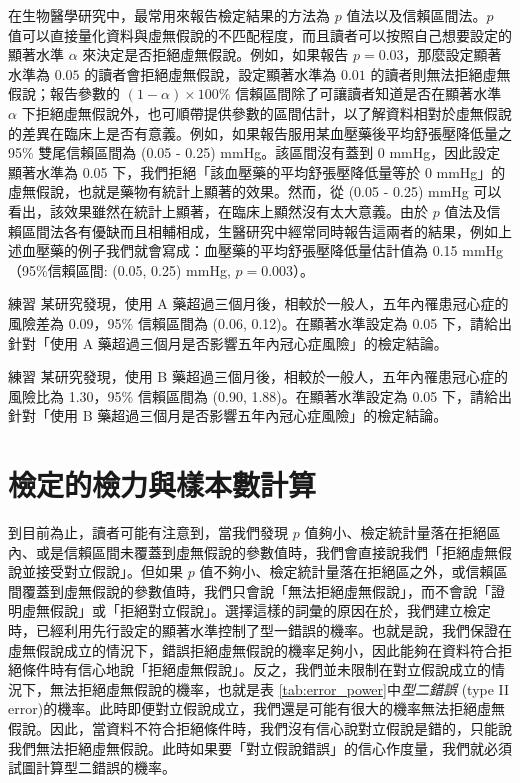     在生物醫學研究中，最常用來報告檢定結果的方法為 $p$ 值法以及信賴區間法。$p$ 值可以直接量化資料與虛無假說的不匹配程度，而且讀者可以按照自己想要設定的顯著水準 $\alpha$ 來決定是否拒絕虛無假說。例如，如果報告 $p=0.03$，那麼設定顯著水準為 $0.05$ 的讀者會拒絕虛無假說，設定顯著水準為 $0.01$ 的讀者則無法拒絕虛無假說；報告參數的 $(1-\alpha)\times 100\%$ 信賴區間除了可讓讀者知道是否在顯著水準 $\alpha$ 下拒絕虛無假說外，也可順帶提供參數的區間估計，以了解資料相對於虛無假說的差異在臨床上是否有意義。例如，如果報告服用某血壓藥後平均舒張壓降低量之 95\% 雙尾信賴區間為 (0.05 - 0.25) mmHg。該區間沒有蓋到 0 mmHg，因此設定顯著水準為 0.05 下，我們拒絕「該血壓藥的平均舒張壓降低量等於 0 mmHg」的虛無假說，也就是藥物有統計上顯著的效果。然而，從 (0.05 - 0.25) mmHg 可以看出，該效果雖然在統計上顯著，在臨床上顯然沒有太大意義。由於 $p$ 值法及信賴區間法各有優缺而且相輔相成，生醫研究中經常同時報告這兩者的結果，例如上述血壓藥的例子我們就會寫成：血壓藥的平均舒張壓降低量估計值為 0.15 mmHg（95\%信賴區間: (0.05, 0.25) mmHg, $p = 0.003$）。

    \bigskip

    \begin{custom}{練習}
        某研究發現，使用 A 藥超過三個月後，相較於一般人，五年內罹患冠心症的風險差為 0.09，95\% 信賴區間為 (0.06, 0.12)。在顯著水準設定為 0.05 下，請給出針對「使用 A 藥超過三個月是否影響五年內冠心症風險」的檢定結論。
    \end{custom}

    \bigskip

    \begin{custom}{練習}
        某研究發現，使用 B 藥超過三個月後，相較於一般人，五年內罹患冠心症的風險比為 1.30，95\% 信賴區間為 (0.90, 1.88)。在顯著水準設定為 0.05 下，請給出針對「使用 B 藥超過三個月是否影響五年內冠心症風險」的檢定結論。
    \end{custom}

\section{檢定的檢力與樣本數計算}

    到目前為止，讀者可能有注意到，當我們發現 $p$ 值夠小、檢定統計量落在拒絕區內、或是信賴區間未覆蓋到虛無假說的參數值時，我們會直接說我們「拒絕虛無假說並接受對立假說」。但如果 $p$ 值不夠小、檢定統計量落在拒絕區之外，或信賴區間覆蓋到虛無假說的參數值時，我們只會說「無法拒絕虛無假說」，而不會說「證明虛無假說」或「拒絕對立假說」。選擇這樣的詞彙的原因在於，我們建立檢定時，已經利用先行設定的顯著水準控制了型一錯誤的機率。也就是說，我們保證在虛無假說成立的情況下，錯誤拒絕虛無假說的機率足夠小，因此能夠在資料符合拒絕條件時有信心地說「拒絕虛無假說」。反之，我們並未限制在對立假說成立的情況下，無法拒絕虛無假說的機率，也就是表 \ref{tab:error_power}中\textit{型二錯誤} (type II error)的機率。此時即便對立假說成立，我們還是可能有很大的機率無法拒絕虛無假說。因此，當資料不符合拒絕條件時，我們沒有信心說對立假說是錯的，只能說我們無法拒絕虛無假說。此時如果要「對立假說錯誤」的信心作度量，我們就必須試圖計算型二錯誤的機率。


